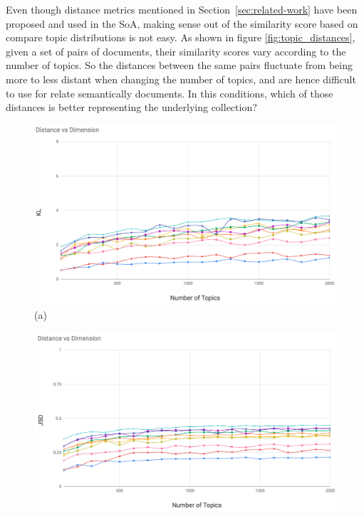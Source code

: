 Even though distance metrics mentioned in Section~\ref{sec:related-work} have been proposed and used in the SoA, making sense out of the similarity score based on compare topic distributions is not easy. As shown in figure \ref{fig:topic_distances}, given a set of pairs of documents, their similarity scores vary according to the number of topics. So the distances between the same pairs fluctuate from being more to less distant when changing the number of topics, and are hence difficult to use for relate semantically documents. In this conditions, which of those distances is better representing the underlying collection?
\begin{figure}
\begin{center}
\begin{adjustbox}{minipage=0.50\linewidth,frame=0pt 3pt}
\includegraphics[width=\linewidth]{KL_100_2k.png}
\centering (a)
\end{adjustbox}
\hfill
\begin{adjustbox}{minipage=0.50\linewidth,frame=0pt 3pt}
\includegraphics[width=\linewidth]{JSD_100_2k.png}

\end{adjustbox}
\end{center}
\end{figure}
